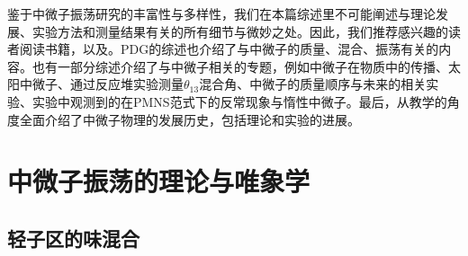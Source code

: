 \documentclass{article}
\begin{document}
	鉴于中微子振荡研究的丰富性与多样性，我们在本篇综述里不可能阐述与理论发展、实验方法和测量结果有关的所有细节与微妙之处。因此，我们推荐感兴趣的读者阅读书籍\cite{FukugitaYanagida2003}\cite{MohapatraPal2004}\cite{GiuntiKim2007}\cite{Bilenky2010}，以及\cite{Zuber2011}\cite{Barger2012}\cite{ValleRomao2015}\cite{Suekane2015}。PDG的综述也介绍了与中微子的质量、混合、振荡有关的内容\cite{Patrignani2016}。也有一部分综述介绍了与中微子相关的专题，例如中微子在物质中的传播\cite{Blennow2013}\cite{Kuo1989}、太阳中微子\cite{Ianni2017}、通过反应堆实验测量$\theta_{13}$混合角\cite{Lachenmaier2015}、中微子的质量顺序与未来的相关实验\cite{Qian2015}、实验中观测到的在PMNS范式下的反常现象与惰性中微子\cite{Abazajian2012}\cite{Gariazzo2016}。最后，\cite{Bilenky2013}从教学的角度全面介绍了中微子物理的发展历史，包括理论和实验的进展。
	
	\section{中微子振荡的理论与唯象学\label{section2}}
	\subsection{轻子区的味混合}
	
	
	
	
	
	
	
	
	
	
	
	
	
	\newpage
	\printbibliography
\end{document}

